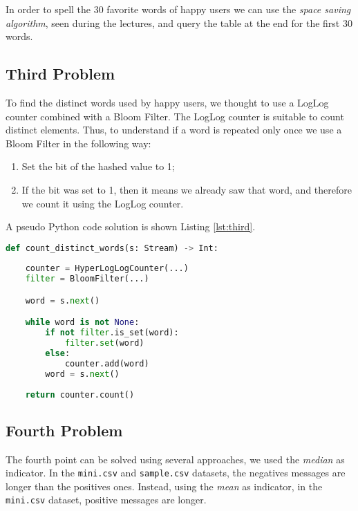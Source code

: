 \documentclass{article}
\begin{document}
\noindent In order to spell the 30 favorite words of happy users we can use the \textit{space saving algorithm}, seen during the lectures, and query the table at the
end for the first 30 words. \newline

\subsection{Third Problem}

\noindent To find the distinct words used by happy users, we thought to use a LogLog counter combined with a Bloom Filter.
The LogLog counter is suitable to count distinct elements. Thus, to understand if a word is repeated only once we use a Bloom Filter in the following way:
\begin{enumerate}
\item Set the bit of the hashed value to 1;
\item If the bit was set to 1, then it means we already saw that word, and therefore we count it using the LogLog counter.
\end{enumerate}
A pseudo Python code solution is shown Listing \ref{lst:third}.

\begin{lstlisting}[language=Python,caption="Pseudo-Code for the third point",label={lst:third}]
def count_distinct_words(s: Stream) -> Int:
    
    counter = HyperLogLogCounter(...)
    filter = BloomFilter(...)

    word = s.next()

    while word is not None:
        if not filter.is_set(word):
            filter.set(word)
        else:
            counter.add(word)
        word = s.next()
    
    return counter.count()

\end{lstlisting}

\subsection{Fourth Problem}

\noindent The fourth point can be solved using several approaches, we used the \textit{median} as indicator. In the \verb+mini.csv+ and \verb+sample.csv+ datasets, the negatives messages are longer than the positives ones.
Instead, using the \textit{mean} as indicator, in the \verb+mini.csv+ dataset, positive messages are longer.
\end{document}
